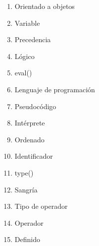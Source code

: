 
\begin{multicols}{4}
  \begin{enumerate}
    \item Orientado a objetos
    \item Variable
    \item Precedencia
    \item Lógico
    \item eval()
    \item Lenguaje de programación
    \item Pseudocódigo
    \item Intérprete
    \item Ordenado
    \item Identificador
    \item type()
    \item Sangría
    \item Tipo de operador
    \item Operador
    \item Definido
  \end{enumerate}
\end{multicols}
